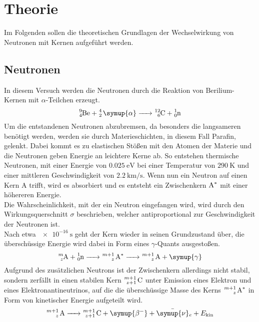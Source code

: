 \section{Theorie} \label{sec:theorie}

    Im Folgenden sollen die theoretischen Grundlagen der Wechselwirkung von Neutronen mit Kernen aufgeführt werden.

\subsection{Neutronen}

    In diesem Versuch werden die Neutronen durch die Reaktion von Berilium-Kernen mit $\alpha$-Teilchen erzeugt.
    \begin{equation}
        \ce{^{9}_{4}Be + ^{4}_{2} \symup{\alpha} -> ^{12}_{6}C + ^{1}_{0}n}
    \end{equation}  
    Um die entstandenen Neutronen abzubremsen, da besonders die langsameren benötigt werden,
    werden sie durch Materieschichten, in diesem Fall Parafin, gelenkt.
    Dabei kommt es zu elastischen Stößen mit den Atomen der Materie und die Neutronen geben Energie an leichtere Kerne ab.
    So entstehen thermische Neutronen, 
    mit einer Energie von $\SI{0,025}{\electronvolt}$ bei einer Temperatur von $\SI{290}{\kelvin}$ 
    und einer mittleren Geschwindigkeit von $\SI{2,2}{\kilo\meter\per\second}$.
    Wenn nun ein Neutron auf einen Kern A trifft, 
    wird es absorbiert und es entsteht ein Zwischenkern $\ce{A^*}$ mit einer höhereren Energie. \\
    Die Wahrscheinlichkeit, mit der ein Neutron eingefangen wird,
    wird durch den Wirkungsquerschnitt $\sigma$ beschrieben,
    welcher antiproportional zur Geschwindigkeit der Neutronen ist. \\
    Nach etwa $\SI{e-16}{\second}$ geht der Kern wieder in seinen Grundzustand über,
    die überschüssige Energie wird dabei in Form eines $\gamma$-Quants ausgestoßen.
    \begin{equation}
        \ce{^{m}_{z}A + ^{1}_{0}n -> ^{m+1}_{z} A^* -> ^{m+1}_{z} A + \symup{\gamma}}
    \end{equation} 
    Aufgrund des zusätzlichen Neutrons ist der Zwischenkern allerdings nicht stabil,
    sondern zerfällt in einen stabilen Kern $\ce{^{m+1}_{z+1} C}$ unter Emission eines Elektron und eines Elektronantineutrinos,
    auf die die überschüssige Masse des Kerns $\ce{^{m+1}_{z} A^*}$ in Form von kinetischer Energie aufgeteilt wird.
    \begin{equation}
        \ce{^{m+1}_{z} A -> ^{m+1}_{z+1} C + \symup{\beta^{-}} + \bar{\symup{\nu}}_e} + E_\text{kin}
    \end{equation}

